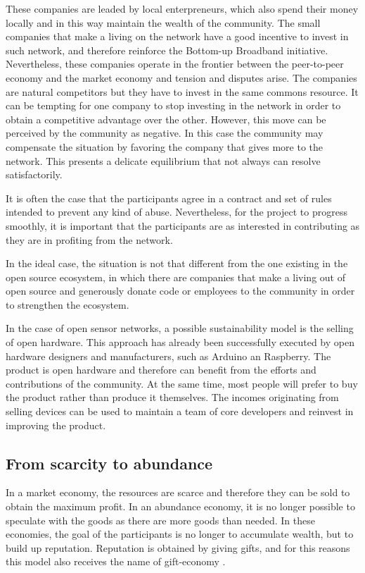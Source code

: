 \documentclass[journal]{IEEEtran}
\begin{document}
These companies are leaded by local enterpreneurs, which also spend their money locally and in this way maintain the wealth of the community.
The small companies that make a living on the network have a good incentive to invest in such network, and therefore reinforce the Bottom-up Broadband initiative.
Nevertheless, these companies operate in the frontier between the peer-to-peer economy and the market economy and tension and disputes arise.
The companies are natural competitors but they have to invest in the same commons resource.
It can be tempting for one company to stop investing in the network in order to obtain a competitive advantage over the other.
However, this move can be perceived by the community as negative.
In this case the community may compensate the situation by favoring the company that gives more to the network.
This presents a delicate equilibrium that not always can resolve satisfactorily.

It is often the case that the participants agree in a contract and set of rules intended to prevent any kind of abuse.
Nevertheless, for the project to progress smoothly, it is important that the participants are as interested in contributing as they are in profiting from the network.

In the ideal case, the situation is not that different from the one existing in the open source ecosystem, in which there are companies that make a living out of open source and generously donate code or employees to the community in order to strengthen the ecosystem.

In the case of open sensor networks, a possible sustainability model is the selling of open hardware.
This approach has already been successfully executed by open hardware designers and manufacturers, such as Arduino an Raspberry.
The product is open hardware and therefore can benefit from the efforts and contributions of the community.
At the same time, most people will prefer to buy the product rather than produce it themselves.
The incomes originating from selling devices can be used to maintain a team of core developers and reinvest in improving the product.


\subsection{From scarcity to abundance}

In a market economy, the resources are scarce and therefore they can be sold to obtain the maximum profit.
In an abundance economy, it is no longer possible to speculate with the goods as there are more goods than needed.
In these economies, the goal of the participants is no longer to accumulate wealth, but to build up reputation.
Reputation is obtained by giving gifts, and for this reasons this model also receives the name of gift-economy \cite{barbrook1998htg}.
\end{document}
